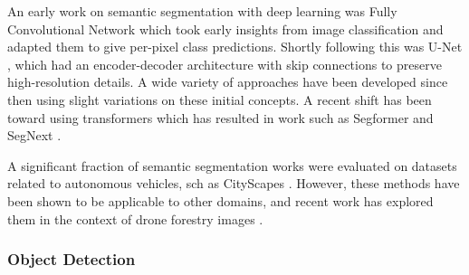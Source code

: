 An early work on semantic segmentation with deep learning was Fully Convolutional Network \cite{Shelhamer2017FullySegmentation} which took early insights from image classification and adapted them to give per-pixel class predictions. Shortly following this was U-Net \cite{RonnebergerUNET2015}, which had an encoder-decoder architecture with skip connections to preserve high-resolution details. A wide variety of approaches have been developed since then using slight variations on these initial concepts. A recent shift has been toward using transformers \cite{Vaswani2017AttentionNeed} which has resulted in work such as Segformer \cite{Xie2021} and SegNext \cite{Guo2022SegNeXt:Segmentation}.

A significant fraction of semantic segmentation works were evaluated on datasets related to autonomous vehicles, sch as CityScapes \cite{Cordts2016}. However, these methods have been shown to be applicable to other domains, and recent work has explored them in the context of drone forestry images \cite{Nogueira2017SemanticConvNets, Neves2020SemanticU-net}. 

\subsubsection{Object Detection}
